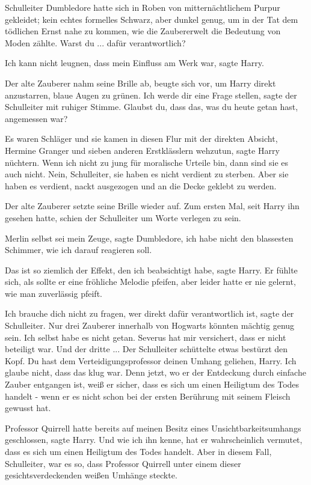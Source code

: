 Schulleiter Dumbledore hatte sich in Roben von mitternächtlichem Purpur
gekleidet; kein echtes formelles Schwarz, aber dunkel genug, um in der Tat dem
tödlichen Ernst nahe zu kommen, wie die Zaubererwelt die Bedeutung von Moden
zählte. \glqq{}Warst du ... dafür verantwortlich?\grqq{}

\glqq{}Ich kann nicht leugnen, dass mein Einfluss am Werk war\grqq{}, sagte
Harry.

Der alte Zauberer nahm seine Brille ab, beugte sich vor, um Harry direkt
anzustarren, blaue Augen zu grünen. \glqq{}Ich werde dir eine Frage
stellen\grqq{}, sagte der Schulleiter mit ruhiger Stimme. \glqq{}Glaubst du, dass
das, was du heute getan hast, angemessen war?\grqq{}

\glqq{}Es waren Schläger und sie kamen in diesen Flur mit der direkten Absicht,
Hermine Granger und sieben anderen Erstklässlern wehzutun\grqq{}, sagte Harry
nüchtern. \glqq{}Wenn ich nicht zu jung für moralische Urteile bin, dann sind sie
es auch nicht. Nein, Schulleiter, sie haben es nicht verdient zu sterben. Aber
sie haben es verdient, nackt ausgezogen und an die Decke geklebt zu
werden.\grqq{}

Der alte Zauberer setzte seine Brille wieder auf. Zum ersten Mal, seit Harry ihn
gesehen hatte, schien der Schulleiter um Worte verlegen zu sein.

\glqq{}Merlin selbst sei mein Zeuge\grqq{}, sagte Dumbledore, \glqq{}ich habe
nicht den blassesten Schimmer, wie ich darauf reagieren soll.\grqq{}

\glqq{}Das ist so ziemlich der Effekt, den ich beabsichtigt habe\grqq{}, sagte
Harry. Er fühlte sich, als sollte er eine fröhliche Melodie pfeifen, aber leider
hatte er nie gelernt, wie man zuverlässig pfeift.

\glqq{}Ich brauche dich nicht zu fragen, wer direkt dafür verantwortlich
ist\grqq{}, sagte der Schulleiter. \glqq{}Nur drei Zauberer innerhalb von
Hogwarts könnten mächtig genug sein. Ich selbst habe es nicht getan. Severus hat
mir versichert, dass er nicht beteiligt war. Und der dritte ...\grqq{} Der
Schulleiter schüttelte etwas bestürzt den Kopf. \glqq{}Du hast dem
Verteidigungsprofessor deinen Umhang geliehen, Harry. Ich glaube nicht, dass das
klug war. Denn jetzt, wo er der Entdeckung durch einfache Zauber entgangen ist,
weiß er sicher, dass es sich um einen Heiligtum des Todes handelt - wenn er es
nicht schon bei der ersten Berührung mit seinem Fleisch gewusst hat.\grqq{}

\glqq{}Professor Quirrell hatte bereits auf meinen Besitz eines
Unsichtbarkeitsumhangs geschlossen\grqq{}, sagte Harry. \glqq{}Und wie ich ihn
kenne, hat er wahrscheinlich vermutet, dass es sich um einen Heiligtum des Todes
handelt. Aber in diesem Fall, Schulleiter, war es so, dass Professor Quirrell
unter einem dieser gesichtsverdeckenden weißen Umhänge steckte.\grqq{}

